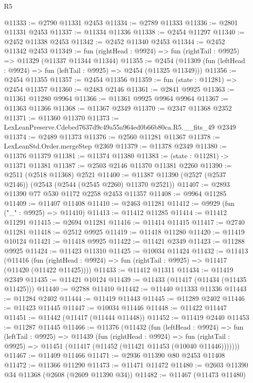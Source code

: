 \begin{lexlean}{R5}
\begin{coremodule}
@11333 := @2790 @11331 @2453
@11334 := @2789 @11333
@11336 := @2801 @11331 @2453
@11337 := @11334 @11336
@11338 := @2454 @11297
@11340 := @2452 @11338 @2453
@11342 := @2452 @11340 @2453
@11344 := @2452 @11342 @2453
@11349 := fun (rightHead : @9924) => fun (rightTail : @9925) => @11329 (@11337 @11344 @11344)
@11355 := @2454 (@11309 (fun (leftHead : @9924) => fun (leftTail : @9925) => @2454 (@11325 @11349)))
@11356 := @2454 @11355
@11357 := @2454 @11356
@11359 := fun (state : @11281) => @2454 @11357
@11360 := @2483 @2146
@11361 := @2841 @9925
@11363 := @11361 @11280 @9964
@11366 := @11361 @9925 @9964 @9964
@11367 := @11363 @11366
@11368 := @11367 @2349
@11370 := @2347 @11368 @2352
@11371 := @11360 @11370
@11373 := LexLeanPreserve.Cdebed7637d9c49a55a964ed0b66b80ca.R5.__fits_49 @2349
@11374 := @2489 @11373
@11376 := @2560 @11281 @11367
@11378 := LexLeanStd.Order.mergeStep @2369
@11379 := @11378 @2349
@11380 := @11376 @11379
@11381 := @11374 @11380
@11383 := (state : @11281) -> @11371 @11381
@11387 := @2503 @2146 @11370 @11381 @2260
@11390 := @2511 (@2518 @11368) @2521
@11400 := @11387 @11390 (@2527 (@2537 @2146)) (@2543 (@2544 (@2545 @2260) @11370 @2521))
@11407 := @2893 @11390 @77 @530 @1172 @2258 @2453 @11357
@11408 := @9964 @11285
@11409 := @11407 @11408
@11410 := @2463 @11281
@11412 := @9929 (fun ("_" : @9925) => @11410)
@11413 := @11412 @11285
@11414 := @11412 @11291
@11415 := @2694 @11281
@11416 := @11414 @11415
@11417 := @2740 @11281
@11418 := @2512 @9925
@11419 := @11418 @11280
@11420 := @11419 @10124
@11421 := @11418 @9925
@11422 := @11421 @2349
@11423 := @11288 @9925
@11424 := @11423 @11310
@11425 := @10034 @11424
@11432 := @11413
    (@11416 (fun (rightHead : @9924) => fun (rightTail : @9925) => @11417 (@11420 (@11422 @11425))))
@11433 := @11412 @11311
@11434 := @11419 @2349
@11435 := @11421 @10124
@11439 := @11433 (@11417 (@11434 (@11435 @11425)))
@11440 := @2788 @11410
@11442 := @11440 @11333 @11336
@11443 := @11284 @2402
@11444 := @11419 @11443
@11445 := @11289 @2402
@11446 := @11423 @11445
@11447 := @10034 @11446
@11448 := @11422 @11447
@11451 := @11442 (@11417 (@11444 @11448))
@11452 := @11419 @2440
@11453 := @11287 @11445
@11466 := @11376
    (@11432
      (fun (leftHead : @9924) =>
      fun (leftTail : @9925) =>
      @11439
        (fun (rightHead : @9924) =>
        fun (rightTail : @9925) => @11451 (@11417 (@11452 (@11421 @11453 (@10040 @11446)))))))
@11467 := @11409 @11466
@11471 := @2936 @11390 @80 @2453 @11408
@11472 := @11366 @11290
@11473 := @11471 @11472
@11480 := @2603 @11390 @34 @11368 (@2608 (@2609 @11390 @34))
@11482 := @11467 (@11473 @11480)

\end{coremodule}
\end{lexlean}
